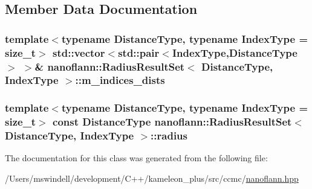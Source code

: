 \subsection{Member Data Documentation}
\hypertarget{classnanoflann_1_1_radius_result_set_a88e8929d22445f82691a4d87969d4b99}{
\subsubsection[{m\-\_\-indices\-\_\-dists}]{\setlength{\rightskip}{0pt plus 5cm}template$<$typename Distance\-Type, typename Index\-Type = size\-\_\-t$>$ std\-::vector$<$std\-::pair$<$Index\-Type,Distance\-Type$>$ $>$\& {\bf nanoflann\-::\-Radius\-Result\-Set}$<$ Distance\-Type, Index\-Type $>$\-::m\-\_\-indices\-\_\-dists}}\label{classnanoflann_1_1_radius_result_set_a88e8929d22445f82691a4d87969d4b99}
\hypertarget{classnanoflann_1_1_radius_result_set_a427684c7ff35ce0bf50075a5cc062d42}{
\subsubsection[{radius}]{\setlength{\rightskip}{0pt plus 5cm}template$<$typename Distance\-Type, typename Index\-Type = size\-\_\-t$>$ const Distance\-Type {\bf nanoflann\-::\-Radius\-Result\-Set}$<$ Distance\-Type, Index\-Type $>$\-::radius}}\label{classnanoflann_1_1_radius_result_set_a427684c7ff35ce0bf50075a5cc062d42}


The documentation for this class was generated from the following file\-:\begin{DoxyCompactItemize}
\item 
/\-Users/mswindell/development/\-C++/kameleon\-\_\-plus/src/ccmc/\hyperlink{nanoflann_8hpp}{nanoflann.\-hpp}\end{DoxyCompactItemize}
